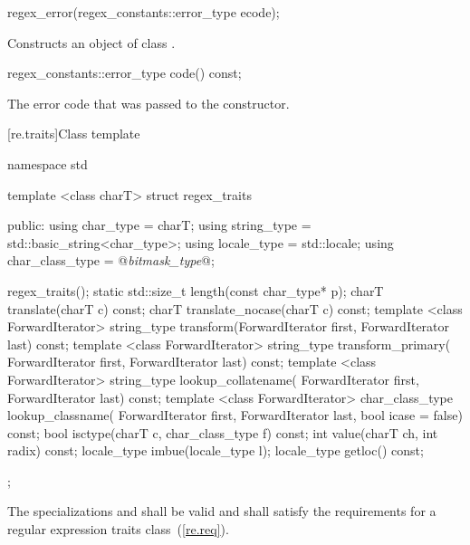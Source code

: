 %
\begin{itemdecl}
regex_error(regex_constants::error_type ecode);
\end{itemdecl}

\begin{itemdescr}
\pnum\effects  Constructs an object of class .

\pnum\postcondition  {}
\end{itemdescr}

%
%
\begin{itemdecl}
regex_constants::error_type code() const;
\end{itemdecl}

\begin{itemdescr}
\pnum\returns The error code that was passed to the constructor.
\end{itemdescr}

[re.traits]{Class template }
%
\begin{codeblock}
namespace std {
  template <class charT>
  struct regex_traits {
  public:
     using char_type       = charT;
     using string_type     = std::basic_string<char_type>;
     using locale_type     = std::locale;
     using char_class_type = @{\itshape bitmask_type}@;

     regex_traits();
     static std::size_t length(const char_type* p);
     charT translate(charT c) const;
     charT translate_nocase(charT c) const;
     template <class ForwardIterator>
       string_type transform(ForwardIterator first, ForwardIterator last) const;
     template <class ForwardIterator>
       string_type transform_primary(
         ForwardIterator first, ForwardIterator last) const;
     template <class ForwardIterator>
       string_type lookup_collatename(
         ForwardIterator first, ForwardIterator last) const;
     template <class ForwardIterator>
       char_class_type lookup_classname(
         ForwardIterator first, ForwardIterator last, bool icase = false) const;
     bool isctype(charT c, char_class_type f) const;
     int value(charT ch, int radix) const;
     locale_type imbue(locale_type l);
     locale_type getloc() const;
  };
}
\end{codeblock}

\pnum
{}%
%
%
The specializations  and
 shall be valid and shall satisfy the
requirements for a regular expression traits class~(\ref{re.req}).

